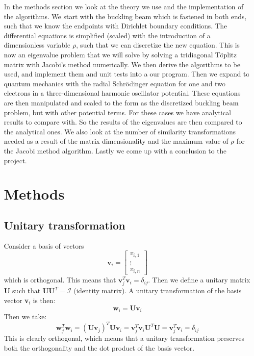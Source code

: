 \documentclass[12pt,a4paper,english]{article}
\begin{document}
In the methods section we look at the theory we use and the implementation of the algorithms. We start with the buckling beam which is fastened in both ends, such that we know the endpoints with Dirichlet boundary conditions. The differential equations is simplified (scaled) with the introduction of a dimensionless variable $\rho$, such that we can discretize the new equation. This is now an eigenvalue problem that we will solve by solving a tridiagonal Töplitz matrix with Jacobi's method numerically. We then derive the algorithms to be used, and implement them and unit tests into a our program. Then we expand to quantum mechanics with the radial Schrödinger equation for one and two electrons in a three-dimensional harmonic oscillator potential. These equations are then manipulated and scaled to the form as the discretized buckling beam problem, but with other potential terms. For these cases we have analytical results to compare with. So the results of the eigenvalues are then compared to the analytical ones. We also look at the number of similarity transformations needed as a result of the matrix dimensionality and the maximum value of $\rho$ for the Jacobi method algorithm. Lastly we come up with a conclusion to the project.

\section{Methods}
\subsection{Unitary transformation}
\label{sect_unitary_transf}
Consider a basis of vectors 
\[\textbf{v}_i = \begin{bmatrix}
v_{i,1}\\
\vdots\\
v_{i,n}
\end{bmatrix}\]
which is orthogonal. This means that $\textbf{v}_j^T\textbf{v}_i=\delta_{ij}$. Then we define a unitary matrix $\textbf{U}$ such that $\textbf{U}\textbf{U}^T=\mathcal{I}$ (identity matrix). A unitary transformation of the basis vector \textbf{v}$_i$ is then:
\begin{equation*}
\textbf{w}_i=\textbf{U}\textbf{v}_i
\end{equation*}
Then we take:
\begin{equation*}
\textbf{w}^T_j\textbf{w}_i=(\textbf{U}\textbf{v}_j)^T\textbf{U}\textbf{v}_i=\textbf{v}_j^T\textbf{v}_i\textbf{U}^T\textbf{U}=\textbf{v}_j^T\textbf{v}_i=\delta_{ij}
\end{equation*}
This is clearly orthogonal, which means that a unitary transformation preserves both the orthogonality and the dot product of the basis vector.
\end{document}
